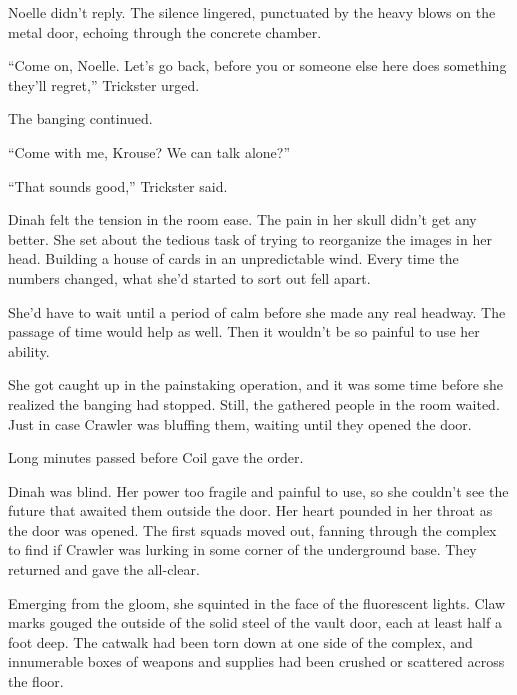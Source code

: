 Noelle didn't reply.  The silence lingered, punctuated by the heavy blows on the metal door, echoing through the concrete chamber.



``Come on, Noelle.  Let's go back, before you or someone else here does something they'll regret,'' Trickster urged.



The banging continued.



``Come with me, Krouse?  We can talk alone?''



``That sounds good,'' Trickster said.



Dinah felt the tension in the room ease.  The pain in her skull didn't get any better.  She set about the tedious task of trying to reorganize the images in her head.  Building a house of cards in an unpredictable wind.  Every time the numbers changed, what she'd started to sort out fell apart.



She'd have to wait until a period of calm before she made any real headway.  The passage of time would help as well.  Then it wouldn't be so painful to use her ability.



She got caught up in the painstaking operation, and it was some time before she realized the banging had stopped.  Still, the gathered people in the room waited.  Just in case Crawler was bluffing them, waiting until they opened the door.



Long minutes passed before Coil gave the order.



Dinah was blind.  Her power too fragile and painful to use, so she couldn't see the future that awaited them outside the door.  Her heart pounded in her throat as the door was opened.  The first squads moved out, fanning through the complex to find if Crawler was lurking in some corner of the underground base.  They returned and gave the all-clear.



Emerging from the gloom, she squinted in the face of the fluorescent lights.  Claw marks gouged the outside of the solid steel of the vault door, each at least half a foot deep.  The catwalk had been torn down at one side of the complex, and innumerable boxes of weapons and supplies had been crushed or scattered across the floor.



